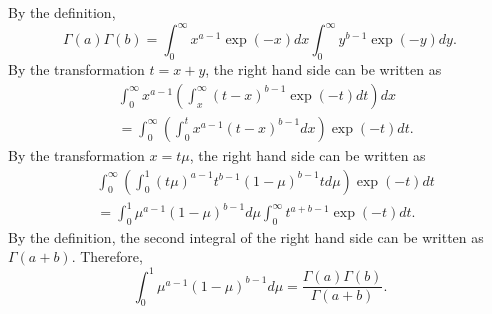 \subsection{}
\label{2.5}
By the definition,
%
\begin{equation}
\Gamma (a) 
\Gamma (b) 
= 
\int_{0}^{\infty} 
x ^ {a - 1} 
\exp (- x) 
dx 
\int_{0}^{\infty} 
y ^ {b - 1} 
\exp (- y) 
dy.
\end{equation}
%
By the transformation $t = x + y$, the right hand side can be written as
%
\begin{equation}
\begin{aligned}
&
\int_{0}^{\infty} 
x ^ {a - 1} 
\left( 
	\int_{x}^{\infty} 
	(t - x) ^ {b - 1} 
	\exp (- t) 
	dt 
\right) 
dx \\
&= 
\int_{0}^{\infty} 
\left( 
	\int_{0}^{t} 
	x ^ {a - 1}
	(t - x) ^ {b - 1} 
	dx 
\right) 
\exp (- t) 
dt.
\end{aligned}
\end{equation}
%
By the transformation $x = t \mu$, the right hand side can be written as
%
\begin{equation}
\begin{aligned}
&
\int_{0}^{\infty} 
\left( 
	\int_{0}^{1} 
	(t \mu) ^ {a - 1} 
	t ^ {b - 1} 
	(1 - \mu) ^ {b - 1} 
	t 
	d\mu 
\right) 
\exp (- t) 
dt \\
&= 
\int_{0}^{1} 
\mu ^ {a - 1} 
(1 - \mu) ^ {b - 1} 
d\mu 
\int_{0}^{\infty} 
t ^ {a + b - 1} 
\exp ( - t ) 
dt.
\end{aligned}
\end{equation}
%
By the definition, the second integral of the right hand side  can be written as $\Gamma(a + b)$.
%
Therefore,
%
\begin{equation}
\int_{0}^{1} 
\mu ^ {a - 1} 
(1 - \mu) ^ {b - 1} 
d\mu 
= 
\frac{\Gamma (a) \Gamma (b)}{\Gamma (a + b)}.
\end{equation}
%


